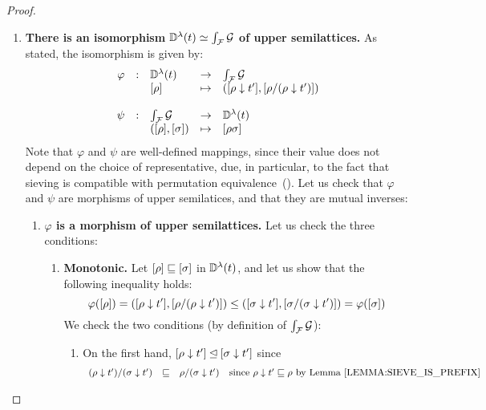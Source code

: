 \begin{proof}
\begin{enumerate}
\item {\bf There is an isomorphism $\mathbb{D}^{\lambda}(t) \simeq \int_{\mathcal{F}}{\mathcal{G}}$ of upper semilattices.}
  As stated, the isomorphism is given by:
  \[
  \begin{array}{rclcl}
    \varphi & : & \mathbb{D}^{\lambda}(t)        & \to     & \int_{\mathcal{F}}{\mathcal{G}} \\
               &&    {[\rho]} & \mapsto & ({[\rho \downarrow t']}, {[\rho/(\rho \downarrow t')]}) \\
  \\
    \psi    & : & \int_{\mathcal{F}}{\mathcal{G}} & \to & \mathbb{D}^{\lambda}(t) \\
               &&  ({[\rho]},{[\sigma]}) & \mapsto & [\rho\sigma] \\
  \end{array}
  \]
  Note that $\varphi$ and $\psi$ are well-defined mappings, since their value does not
  depend on the choice of representative, due, in particular, to the fact that sieving
  is compatible with permutation equivalence~().
  Let us check that $\varphi$ and $\psi$ are morphisms of upper semilatices,
  and that they are mutual inverses:
  \begin{enumerate}
  \item {\bf $\varphi$ is a morphism of upper semilattices.}
    Let us check the three conditions:
    \begin{enumerate}
    \item {\bf Monotonic.}
      Let ${[\rho]} \sqsubseteq {[\sigma]}$ in $\mathbb{D}^{\lambda}(t)$,
      and let us show that the following inequality holds:
      \[
        \varphi({[\rho]}) =
        ({[\rho \downarrow t']}, {[\rho/(\rho \downarrow t')]})
        \leq
        ({[\sigma \downarrow t']}, {[\sigma/(\sigma \downarrow t')]})
        = \varphi({[\sigma]})
      \]
      We check the two conditions (by definition of $\int_{\mathcal{F}}{\mathcal{G}}$):
      \begin{enumerate}
      \item On the first hand,
            ${[\rho \downarrow t']} \unlhd {[\sigma\downarrow t']}$
            since
            \[
              \begin{array}{rcll}
              (\redseq \sieve \tm')/(\redseqtwo \sieve \tm')
              & \permle &
              \redseq/(\redseqtwo \sieve \tm') & \text{since $\redseq \sieve \tm' \permle \redseq$ by \rlem{sieve_is_prefix}} \\

\end{array}\]
\end{enumerate}
\end{enumerate}
\end{enumerate}
\end{enumerate}
\end{proof}
